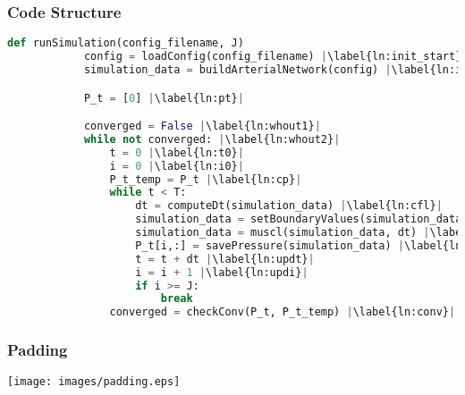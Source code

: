 \documentclass{beamer}
\begin{document}
\begin{frame} [fragile]
	\frametitle{Code Structure}
	\begin{lstlisting}[basicstyle=\fontsize{8}{8}\selectfont\ttfamily, language=Python, caption=The code structure of an entire simulation is given here in pseudocode. Each line is detailed throughout this section., label=lst:pc, escapechar=|] 
		def runSimulation(config_filename, J) 
			config = loadConfig(config_filename) |\label{ln:init_start}|
			simulation_data = buildArterialNetwork(config) |\label{ln:init_end}|

			P_t = [0] |\label{ln:pt}|

			converged = False |\label{ln:whout1}|
			while not converged: |\label{ln:whout2}|
				t = 0 |\label{ln:t0}|
				i = 0 |\label{ln:i0}|
				P_t_temp = P_t |\label{ln:cp}|
				while t < T:
					dt = computeDt(simulation_data) |\label{ln:cfl}|
					simulation_data = setBoundaryValues(simulation_data, dt) |\label{ln:bv    }|
					simulation_data = muscl(simulation_data, dt) |\label{ln:muscl}|
					P_t[i,:] = savePressure(simulation_data) |\label{ln:svp}|
					t = t + dt |\label{ln:updt}|
					i = i + 1 |\label{ln:updi}|
					if i >= J:
						break
				converged = checkConv(P_t, P_t_temp) |\label{ln:conv}|
	\end{lstlisting}
\end{frame}
\begin{frame}
	\frametitle{Padding}
	\texttt{[image: images/padding.eps]}
\end{frame}
\end{document}
